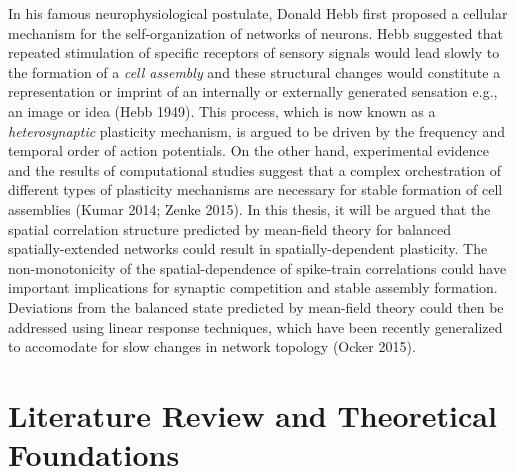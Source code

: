 \documentclass{ucetd}
\begin{document}
In his famous neurophysiological postulate, Donald Hebb first proposed a cellular mechanism for the self-organization of networks of neurons. Hebb suggested that repeated stimulation of specific receptors of sensory signals would lead slowly to the formation of a \emph{cell assembly} and these structural changes would constitute a representation or imprint of an internally or externally generated sensation e.g., an image or idea (Hebb 1949). This process, which is now known as a \emph{heterosynaptic} plasticity mechanism, is argued to be driven by the frequency and temporal order of action potentials. On the other hand, experimental evidence and the results of computational studies suggest that a complex orchestration of different types of plasticity mechanisms are necessary for stable formation of cell assemblies (Kumar 2014; Zenke 2015). In this thesis, it will be argued that the spatial correlation structure predicted by mean-field theory for balanced spatially-extended networks could result in spatially-dependent plasticity. The non-monotonicity of the spatial-dependence of spike-train correlations could have important implications for synaptic competition and stable assembly formation. Deviations from the balanced state predicted by mean-field theory could then be addressed using linear response techniques, which have been recently generalized to accomodate for slow changes in network topology (Ocker 2015).

\clearpage
\section{Literature Review and Theoretical Foundations}
\end{document}
